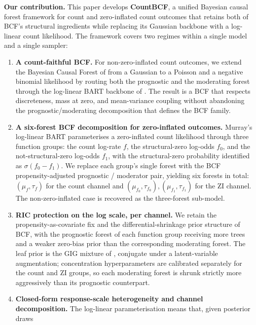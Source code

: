 \documentclass[11pt]{article}
\theoremstyle{plain}
\theoremstyle{definition}
\theoremstyle{remark}
\newcommand{\muF}{\mu_f}
\newcommand{\tauF}{\tau_f}
\newcommand{\fzeroSym}{f_{0}}
\newcommand{\foneSym}{f_{1}}
\newcommand{\muFzero}{\mu_{f_{0}}}
\newcommand{\muFone}{\mu_{f_{1}}}
\newcommand{\tauFzero}{\tau_{f_{0}}}
\newcommand{\tauFone}{\tau_{f_{1}}}
\begin{document}
\medskip
\noindent\textbf{Our contribution.}
This paper develops \textbf{CountBCF}, a unified Bayesian causal
forest framework for count and zero-inflated count outcomes that
retains both of BCF's structural ingredients while replacing its
Gaussian backbone with a log-linear count likelihood. The framework
covers two regimes within a single model and a single sampler:
\begin{enumerate}
  \item \textbf{A count-faithful BCF.}
    For non-zero-inflated count outcomes, we extend the Bayesian
    Causal Forest of \citet{hahn2020bayesian} from a Gaussian to a
    Poisson and a negative binomial likelihood by routing both the
    prognostic and the moderating forest through the log-linear BART
    backbone of \citet{murray2021loglinear}. The result is a BCF
    that respects discreteness, mass at zero, and mean-variance
    coupling without abandoning the prognostic/moderating
    decomposition that defines the BCF family.
  \item \textbf{A six-forest BCF decomposition for zero-inflated
    outcomes.}
    Murray's log-linear BART parameterises a zero-inflated count
    likelihood through three function groups: the count log-rate
    $f$, the structural-zero log-odds $\fzeroSym$, and the
    not-structural-zero log-odds $\foneSym$, with the structural-zero
    probability identified as $\sigma(\fzeroSym - \foneSym)$. We
    replace each group's single forest with the BCF
    propensity-adjusted prognostic / moderator pair, yielding six
    forests in total: $(\muF, \tauF)$ for the count channel and
    $(\muFzero, \tauFzero), (\muFone, \tauFone)$ for the ZI channel.
    The non-zero-inflated case is recovered as the three-forest sub-model.
  \item \textbf{RIC protection on the log scale, per channel.}
    We retain the propensity-as-covariate fix and the
    differential-shrinkage prior structure of BCF, with the
    prognostic forest of each function group receiving more trees and
    a weaker zero-bias prior than the corresponding moderating
    forest. The leaf prior is the GIG mixture of
    \citet{murray2021loglinear}, conjugate under a latent-variable
    augmentation; concentration hyperparameters are calibrated
    separately for the count and ZI groups, so each moderating forest
    is shrunk strictly more aggressively than its prognostic
    counterpart.
  \item \textbf{Closed-form response-scale heterogeneity and channel
    decomposition.}
    The log-linear parameterisation means that, given posterior draws

\end{enumerate}
\end{document}
